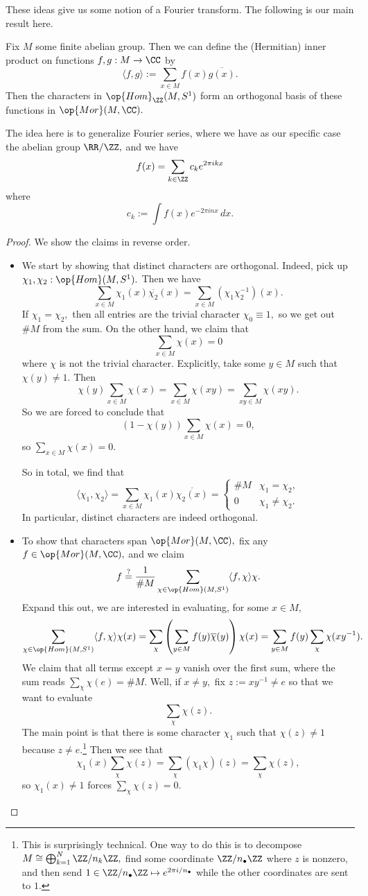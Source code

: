 \documentclass[../notes.tex]{subfiles}
\begin{document}
These ideas give us some notion of a Fourier transform. The following is our main result here.
\begin{theorem}
	Fix $M$ some finite abelian group. Then we can define the (Hermitian) inner product on functions $f,g:M\to\CC$ by
	\[\langle f,g\rangle:=\sum_{x\in M}f(x)\overline{g(x)}.\]
	Then the characters in $\op{Hom}_\ZZ(M,S^1)$ form an orthogonal basis of these functions in $\op{Mor}(M,\CC).$
\end{theorem}
The idea here is to generalize Fourier series, where we have as our specific case the abelian group $\RR/\ZZ,$ and we have
\[f(x)=\sum_{k\in\ZZ}c_ke^{2\pi ikx}\]
where
\[c_k:=\int f(x)e^{-2\pi inx}\,dx.\]
\begin{proof}
	We show the claims in reverse order.
	\begin{itemize}
		\item We start by showing that distinct characters are orthogonal. Indeed, pick up $\chi_1,\chi_2:\op{Hom}(M,S^1).$ Then we have
		\[\sum_{x\in M}\chi_1(x)\overline{\chi_2}(x)=\sum_{x\in M}(\chi_1\chi_2^{-1})(x).\]
		If $\chi_1=\chi_2,$ then all entries are the trivial character $\chi_0\equiv1,$ so we get out $\#M$ from the sum. On the other hand, we claim that
		\[\sum_{x\in M}\chi(x)=0\]
		where $\chi$ is not the trivial character. Explicitly, take some $y\in M$ such that $\chi(y)\ne1.$ Then
		\[\chi(y)\sum_{x\in M}\chi(x)=\sum_{x\in M}\chi(xy)=\sum_{xy\in M}\chi(xy).\]
		So we are forced to conclude that
		\[(1-\chi(y))\sum_{x\in M}\chi(x)=0,\]
		so $\sum_{x\in M}\chi(x)=0.$
	
		So in total, we find that
		\[\langle\chi_1,\chi_2\rangle=\sum_{x\in M}\chi_1(x)\overline{\chi_2(x)}=\begin{cases}
			\#M & \chi_1=\chi_2, \\
			0 & \chi_1\ne\chi_2.
		\end{cases}\]
		In particular, distinct characters are indeed orthogonal.
		\item To show that characters span $\op{Mor}(M,\CC),$ fix any $f\in\op{Mor}(M,\CC),$ and we claim
		\[f\stackrel?=\frac1{\#M}\sum_{\chi\in\op{Hom}(M,S^1)}\langle f,\chi\rangle\chi.\]
		Expand this out, we are interested in evaluating, for some $x\in M,$
		\[\sum_{\chi\in\op{Hom}(M,S^1)}\langle f,\chi\rangle\chi(x)=\sum_\chi\left(\sum_{y\in M}f(y)\overline\chi(y)\right)\chi(x)=\sum_{y\in M}f(y)\sum_\chi\chi(xy^{-1}).\]
		We claim that all terms except $x=y$ vanish over the first sum, where the sum reads $\sum_\chi\chi(e)=\#M.$ Well, if $x\ne y,$ fix $z:=xy^{-1}\ne e$ so that we want to evaluate
		\[\sum_\chi\chi(z).\]
		The main point is that there is some character $\chi_1$ such that $\chi(z)\ne1$ because $z\ne e.$\footnote{This is surprisingly technical. One way to do this is to decompose $M\cong\bigoplus_{k=1}^N\ZZ/n_k\ZZ,$ find some coordinate $\ZZ/n_\bullet\ZZ$ where $z$ is nonzero, and then send $1\in\ZZ/n_\bullet\ZZ\mapsto e^{2\pi i/n_\bullet}$ while the other coordinates are sent to $1.$} Then we see that
		\[\chi_1(x)\sum_\chi\chi(z)=\sum_\chi(\chi_1\chi)(z)=\sum_\chi\chi(z),\]
		so $\chi_1(x)\ne1$ forces $\sum_\chi\chi(z)=0.$
		

\end{itemize}
\end{proof}
\end{document}
